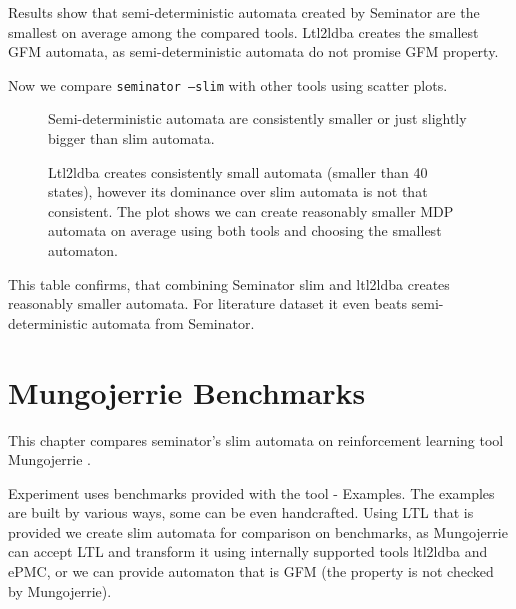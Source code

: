 \documentclass[
	digital,
nolof, nolot
]{fithesis3}
\begin{document}
		\begin{table}[ht]
			\centering
			\caption{Results show that semi-deterministic automata created by Seminator are the smallest on average among the compared tools. Ltl2ldba creates the smallest GFM automata, as semi-deterministic automata do not promise GFM property. }
			
		\end{table}
		
		
		
		Now we compare \texttt{seminator --slim} with other tools using scatter plots.
		\begin{figure}[ht]
			\centering
			\caption{Semi-deterministic automata are consistently smaller or just slightly bigger than slim automata.}
			\begin{tikzpicture}
				
			\end{tikzpicture}
		\end{figure}
		
		
		\begin{figure}[ht]
			\centering
			\caption{Ltl2ldba creates consistently small automata (smaller than 40 states), however its dominance over slim automata is not that consistent. The plot shows we can create reasonably smaller MDP automata on average using both tools and choosing the smallest automaton. }
		\begin{tikzpicture}
		
		\end{tikzpicture}
		\end{figure}
	
	\begin{table}[ht]
		\centering
		\caption{This table confirms, that combining Seminator slim and ltl2ldba creates reasonably smaller automata. For literature dataset it even beats semi-deterministic automata from Seminator.}
		
	\end{table}

	\chapter{Mungojerrie Benchmarks}
	This chapter compares seminator's slim automata on reinforcement learning tool Mungojerrie \cite{mungojerrie}.
	
	Experiment uses benchmarks provided with the tool - Examples. The examples are built by various ways, some can be even handcrafted. Using LTL that is provided we create slim automata for comparison on benchmarks, as Mungojerrie can accept LTL and transform it using internally supported tools ltl2ldba and ePMC, or we can provide automaton that is GFM (the property is not checked by Mungojerrie).
	
\end{document}
